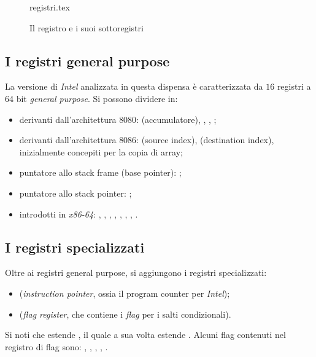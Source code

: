 \begin{figure}[H]
	\centering
	{registri.tex}
	\caption{Il registro  e i suoi sottoregistri}
\end{figure}

\subsection{I registri general purpose}
La versione di \emph{Intel} analizzata in questa dispensa è caratterizzata da \(16\) registri a 64 bit \emph{general purpose}. Si possono dividere in:
\begin{itemize}
	\item derivanti dall'architettura \(8080\):  (accumulatore), , , ;
	\item derivanti dall'architettura \(8086\):  (source index),  (destination index), inizialmente concepiti per la copia di array;
	\item puntatore allo stack frame (base pointer): ;
	\item puntatore allo stack pointer: ;
	\item introdotti in \emph{x86-64}: , , , , , , , .
\end{itemize}

\subsection{I registri specializzati}
Oltre ai registri general purpose, si aggiungono i registri specializzati:
\begin{itemize}
	\item {} (\emph{instruction pointer}, ossia il program counter per \emph{Intel});
	\item {} (\emph{flag register}, che contiene i \emph{flag} per i salti condizionali).
\end{itemize}
Si noti che  estende , il quale a sua volta estende . Alcuni flag contenuti nel registro di flag sono: , , , , .

